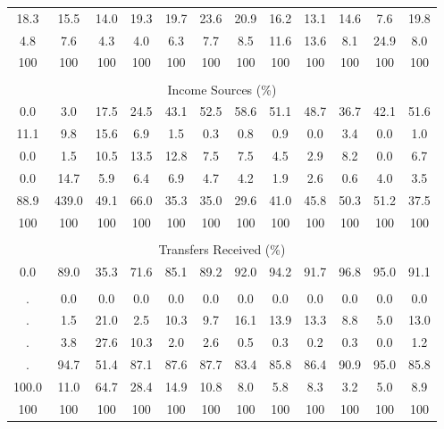 \begin{tabular}{c c c| c c c c c| c c c| c}
18.3 & 15.5 & 14.0 & 19.3 & 19.7 & 23.6 & 20.9 & 16.2 & 13.1 & 14.6 & 7.6 & 19.8 \\
4.8 & 7.6 & 4.3 & 4.0 & 6.3 & 7.7 & 8.5 & 11.6 & 13.6 & 8.1 & 24.9 & 8.0 \\
\midrule
100 & 100 & 100 & 100 & 100 & 100 & 100 & 100 & 100 & 100 & 100 & 100 \\
\midrule \\
\multicolumn{12}{c}{Income Sources (\%)}  \\
\midrule
0.0 & 3.0 & 17.5 & 24.5 & 43.1 & 52.5 & 58.6 & 51.1 & 48.7 & 36.7 & 42.1 & 51.6 \\
11.1 & 9.8 & 15.6 & 6.9 & 1.5 & 0.3 & 0.8 & 0.9 & 0.0 & 3.4 & 0.0 & 1.0 \\
0.0 & 1.5 & 10.5 & 13.5 & 12.8 & 7.5 & 7.5 & 4.5 & 2.9 & 8.2 & 0.0 & 6.7 \\
0.0 & 14.7 & 5.9 & 6.4 & 6.9 & 4.7 & 4.2 & 1.9 & 2.6 & 0.6 & 4.0 & 3.5 \\
88.9 & 439.0 & 49.1 & 66.0 & 35.3 & 35.0 & 29.6 & 41.0 & 45.8 & 50.3 & 51.2 & 37.5 \\
\midrule
100 & 100 & 100 & 100 & 100 & 100 & 100 & 100 & 100 & 100 & 100 & 100 \\
\midrule \\
\multicolumn{12}{c}{Transfers Received (\%)}  \\
\midrule
0.0 & 89.0 & 35.3 & 71.6 & 85.1 & 89.2 & 92.0 & 94.2 & 91.7 & 96.8 & 95.0 & 91.1 \\
 & & & & & & & & & & &  \\
. & 0.0 & 0.0 & 0.0 & 0.0 & 0.0 & 0.0 & 0.0 & 0.0 & 0.0 & 0.0 & 0.0 \\
. & 1.5 & 21.0 & 2.5 & 10.3 & 9.7 & 16.1 & 13.9 & 13.3 & 8.8 & 5.0 & 13.0 \\
. & 3.8 & 27.6 & 10.3 & 2.0 & 2.6 & 0.5 & 0.3 & 0.2 & 0.3 & 0.0 & 1.2 \\
. & 94.7 & 51.4 & 87.1 & 87.6 & 87.7 & 83.4 & 85.8 & 86.4 & 90.9 & 95.0 & 85.8 \\
100.0 & 11.0 & 64.7 & 28.4 & 14.9 & 10.8 & 8.0 & 5.8 & 8.3 & 3.2 & 5.0 & 8.9 \\
\midrule
100 & 100 & 100 & 100 & 100 & 100 & 100 & 100 & 100 & 100 & 100 & 100 \\
\bottomrule
\end{tabular}